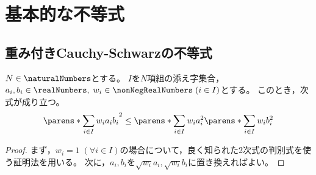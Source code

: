 \chapter{基本的な不等式}
    \section{重み付きCauchy-Schwarzの不等式}
        \label{discrete_weighted_Cauchy_Schwarz_inequality}
        \begin{shadebox}
            $N\in\naturalNumbers$とする。
            $I$を$N$項組の添え字集合，$a_i,b_i\in\realNumbers,\;w_i\in\nonNegRealNumbers\;(i\in I)$とする。
            このとき，次式が成り立つ。
            \[ \parens*{\sum_{i\in I} w_i a_i b_i}^2 \leq \parens*{\sum_{i\in I} w_i a_i^2} \parens*{\sum_{i\in I} w_i b_i^2} \]
        \end{shadebox}
        \begin{proof}
            まず，$w_i=1\;(\forall i\in I)$の場合について，良く知られた2次式の判別式を使う証明法を用いる。
            次に，$a_i,b_i$を$\sqrt{w_i}a_i,\sqrt{w_i}b_i$に置き換えればよい。
        \end{proof}